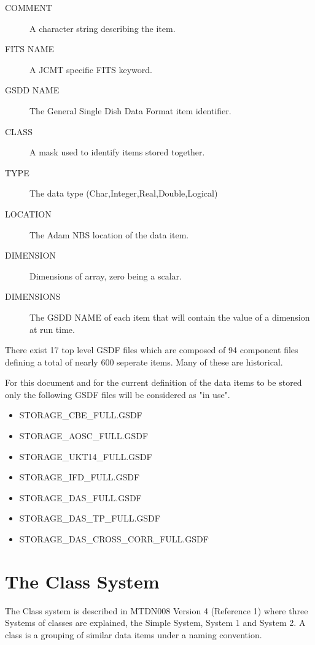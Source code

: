 \begin{description}
  \item [COMMENT]    A character string describing the item.
  \item [FITS NAME]  A JCMT specific FITS keyword.
  \item [GSDD NAME]  The General Single Dish Data Format item identifier.
  \item [CLASS]      A mask used to identify items stored together.
  \item [TYPE]       The data type (Char,Integer,Real,Double,Logical) 
  \item [LOCATION]   The Adam NBS location of the data item.
  \item [DIMENSION]  Dimensions of array, zero being a scalar.
  \item [DIMENSIONS] The GSDD NAME of each item that will contain the value 
                     of a dimension at run time.
\end{description}

   There exist 17 top level GSDF files which are composed of 94 component 
files defining a total of nearly 600 seperate items. Many of these are
historical.

   For this document and for the current definition of the data items to
be stored only the following GSDF files will be considered as "in use".

\begin{itemize}
  \item STORAGE\_CBE\_FULL.GSDF
  \item STORAGE\_AOSC\_FULL.GSDF
  \item STORAGE\_UKT14\_FULL.GSDF
  \item STORAGE\_IFD\_FULL.GSDF
  \item STORAGE\_DAS\_FULL.GSDF
  \item STORAGE\_DAS\_TP\_FULL.GSDF
  \item STORAGE\_DAS\_CROSS\_CORR\_FULL.GSDF
\end{itemize}



\newpage
\section{The Class System}

  The Class system is described in MTDN008 Version 4 (Reference 1) 
where three Systems of classes are explained, the Simple System, 
System 1 and System 2. A class is a grouping of similar data items
under a naming convention.


